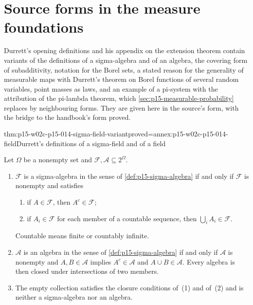 \section{Source forms in the measure foundations}
\label{sec:p15-w02c-p15-014-foundations}

Durrett's opening definitions and his appendix on the extension theorem
contain variants of the definitions of a sigma-algebra and of an
algebra, the covering form of subadditivity, notation for the Borel sets,
a stated reason for the generality of measurable maps with Durrett's
theorem on Borel functions of several random variables, point masses as
laws, and an example of a pi-system with the attribution of the
pi-lambda theorem, which \cref{sec:p15-measurable-probability} replaces by neighbouring
forms. They are given here in the source's form, with the bridge to the
handbook's form proved.

\begin{hblemma}{thm:p15-w02c-p15-014-sigma-field-variant}{proved=annex:p15-w02c-p15-014-field}{Durrett's definitions of a sigma-field and of a field}
\par\nobreak
Let \(\Omega\) be a nonempty set and \(\mathcal F,\mathcal A\subseteq2^\Omega\).
\begin{enumerate}
\item \(\mathcal F\) is a sigma-algebra in the sense of
      \cref{def:p15-sigma-algebra} if and only if \(\mathcal F\) is
      nonempty and satisfies
      \begin{enumerate}
      \item if \(A\in\mathcal F\), then \(A^c\in\mathcal F\);
      \item if \(A_i\in\mathcal F\) for each member of a countable
            sequence, then \(\bigcup_iA_i\in\mathcal F\).
      \end{enumerate}
      Countable means finite or countably infinite.
\item \(\mathcal A\) is an algebra in the sense of
      \cref{def:p15-sigma-algebra} if and only if \(\mathcal A\) is
      nonempty and \(A,B\in\mathcal A\) implies \(A^c\in\mathcal A\)
      and \(A\cup B\in\mathcal A\). Every algebra is then closed under
      intersections of two members.
\item The empty collection satisfies the closure conditions of~(1)
      and of~(2) and is neither a sigma-algebra nor an algebra.
\end{enumerate}
\end{hblemma}

